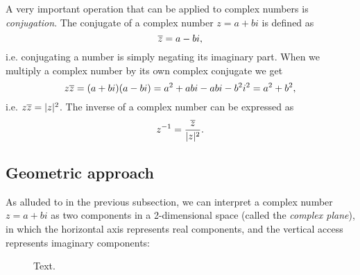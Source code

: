 A very important operation that can be applied to complex numbers is \emph{conjugation}. The conjugate of a complex number $z=a+bi$ is defined as
\begin{equation}
	\overline{z} = a-bi,
	\label{eq:complex_conjugation}
\end{equation}
i.e. conjugating a number is simply negating its imaginary part. When we multiply a complex number by its own complex conjugate we get
\begin{equation}
	z\overline{z} = (a+bi)(a-bi) = a^{2} + abi - abi - b^{2}i^{2} = a^{2}+b^{2},
	\label{eq:conjugate_product}
\end{equation}
i.e. $z\overline{z} = |z|^{2}$. The inverse of a complex number can be expressed as
\begin{equation}
	z^{-1} = \frac{\overline{z}}{|z|^{2}}.
	\label{eq:complex_inverse}
\end{equation}

\subsection{Geometric approach}
As alluded to in the previous subsection, we can interpret a complex number $z=a+bi$ as two components in a 2-dimensional space (called the \emph{complex plane}), in which the horizontal axis represents real components, and the vertical access represents imaginary components:
\begin{figure}
	\centering
	\caption{Text.}
	\label{fig:complex number}
\end{figure}

